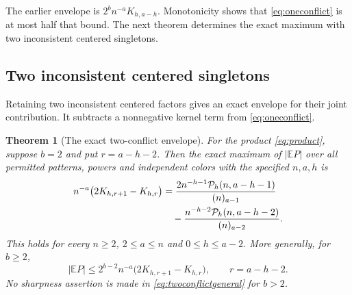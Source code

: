 \documentclass[11pt]{article}
\newtheorem{theorem}{Theorem}[section]
\theoremstyle{definition}
\theoremstyle{remark}
\newcommand{\E}{\mathbb E}
\newcommand{\1}{\mathbf 1}
\begin{document}
The earlier envelope is $2^bn^{-a}K_{h,a-h}$. Monotonicity shows that \eqref{eq:oneconflict} is at most half that bound. The next theorem determines the exact maximum with two inconsistent centered singletons.


\subsection{Two inconsistent centered singletons}

Retaining two inconsistent centered factors gives an exact envelope for their joint contribution. It subtracts a nonnegative kernel term from \eqref{eq:oneconflict}.

\begin{theorem}[The exact two-conflict envelope]\label{thm:twoconflict}
For the product \eqref{eq:product}, suppose $b=2$ and put $r=a-h-2$. Then the exact maximum of $|\E P|$ over all permitted patterns, powers and independent colors with the specified $n,a,h$ is
\begin{align}
n^{-a}\bigl(2K_{h,r+1}-K_{h,r}\bigr)
&=\frac{2n^{-h-1}\mathcal P_h(n,a-h-1)}{(n)_{a-1}}\notag\\
&\quad-\frac{n^{-h-2}\mathcal P_h(n,a-h-2)}{(n)_{a-2}}.
\label{eq:twoconflictexact}
\end{align}
This holds for every $n\ge2$, $2\le a\le n$ and $0\le h\le a-2$. More generally, for $b\ge2$,
\begin{equation}\label{eq:twoconflictgeneral}
|\E P|\le2^{b-2}n^{-a}\bigl(2K_{h,r+1}-K_{h,r}\bigr),
\qquad r=a-h-2.
\end{equation}
No sharpness assertion is made in \eqref{eq:twoconflictgeneral} for $b>2$.
\end{theorem}
\end{document}
